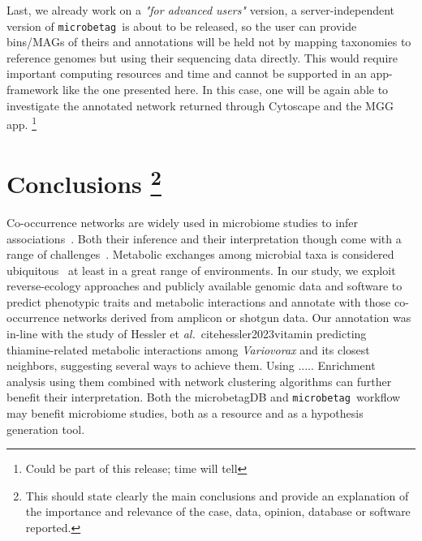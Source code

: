 \documentclass[sn-mathphys,Numbered]{sn-jnl}  %
\theoremstyle{thmstyleone}%
\theoremstyle{thmstyletwo}%
\theoremstyle{thmstylethree}%
\newcommand{\microbetag}{\texttt{microbetag }}
\begin{document}
        Last, we already work on a \textit{"for advanced users"} version, a server-independent version of \microbetag is about to be released, so the user can provide bins/MAGs of theirs and annotations will be held not by mapping taxonomies to reference genomes but using their sequencing data directly.
        This would require important computing resources and time and cannot be supported in an app-framework like the one presented here. 
        In this case, one will be again able to investigate the annotated network returned through Cytoscape and the MGG app.
        \footnote{Could be part of this release; time will tell }




\section*{Conclusions
\footnote{
    This should state clearly the main conclusions and provide an explanation of the importance and relevance of the case, data, opinion, database or software reported.
}
}
\label{sec:conclusions}


    Co-occurrence networks are widely used in microbiome studies to infer associations~\cite{rottjers2018hairballs}. 
    Both their inference and their interpretation though come with a range of challenges~\cite{faust2021open}.
    Metabolic exchanges among microbial taxa is considered ubiquitous~\cite{kost2023metabolic} at least in a great range of environments. 
    In our study, we exploit reverse-ecology approaches and publicly available genomic data and software to predict phenotypic traits and metabolic interactions and annotate with those co-occurrence networks derived from amplicon or shotgun data.
    Our annotation was in-line with the study of Hessler et \textit{al.}~cite{hessler2023vitamin} predicting thiamine-related metabolic interactions among \textit{Variovorax} and its closest neighbors, suggesting several ways to achieve them. 
    Using ..... 
    Enrichment analysis using them combined with network clustering algorithms can further benefit their interpretation. 
    Both the microbetagDB and \microbetag workflow may benefit microbiome studies, both as a resource and as a hypothesis generation tool.
\end{document}
